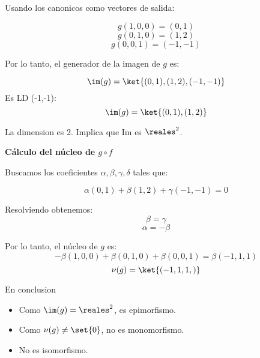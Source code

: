 Usando los canonicos como vectores de salida:

$$ g(1,0,0) = (0,1) $$
$$ g(0,1,0) = (1,2) $$
$$ g(0,0,1) = (-1,-1) $$

Por lo tanto, el generador de la imagen de $ g $ es:

$$ \im(g) = \ket{(0,1), (1,2), (-1,-1)} $$
Es LD (-1,-1):
$$ \im(g) = \ket{(0,1), (1,2)} $$

La dimension es 2. Implica que Im es $ \reales^2 $.

\textbf{Cálculo del núcleo de $ g \circ f $}

Buscamos los coeficientes $ \alpha, \beta, \gamma, \delta $ tales que:

$$ \alpha(0,1) + \beta(1,2) + \gamma(-1,-1) = 0 $$

Resolviendo obtenemos:
$$ \beta = \gamma$$
$$ \alpha = -\beta $$

Por lo tanto, el núcleo de $ g $ es:
$$ -\beta(1,0,0) + \beta(0,1,0) + \beta(0,0,1) = \beta(-1,1,1) $$
$$ \nu(g) = \ket{ (-1,1,1,) } $$

En conclusion

\begin{itemize}
  \item Como $ \im(g) = \reales^2 $, es epimorfismo.
  \item Como $ \nu(g) \neq \set{0} $, no es monomorfismo.
  \item No es isomorfismo.
\end{itemize}

\begin{aportes}
  \item {}
\end{aportes}
